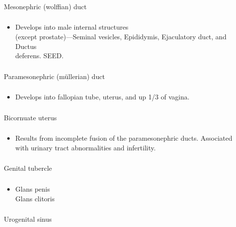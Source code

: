 \documentclass[11pt]{beamer}
\begin{document}
\begin{frame}
 \frametitle{}
Mesonephric (wolffian) duct
\end{frame}

\begin{frame}
 \frametitle{}
\begin{itemize}
\item{Develops into male internal structures \\ (except prostate)––Seminal vesicles, Epididymis, Ejaculatory duct, and Ductus \\ deferens. SEED.}
\end{itemize}
\end{frame}

\begin{frame}
 \frametitle{}
Paramesonephric (müllerian) duct
\end{frame}

\begin{frame}
 \frametitle{}
\begin{itemize}
\item{Develops into fallopian tube, uterus, and up 1/3 of vagina.}
\end{itemize}
\end{frame}

\begin{frame}
 \frametitle{}
Bicornuate uterus
\end{frame}

\begin{frame}
 \frametitle{}
\begin{itemize}
\item{Results from incomplete fusion of the paramesonephric ducts. Associated with urinary tract abnormalities and infertility.}
\end{itemize}
\end{frame}

\begin{frame}
 \frametitle{}
Genital tubercle
\end{frame}

\begin{frame}
 \frametitle{}
\begin{itemize}
\item{Glans penis \\ Glans clitoris}
\end{itemize}
\end{frame}

\begin{frame}
 \frametitle{}
Urogenital sinus
\end{frame}
\end{document}
